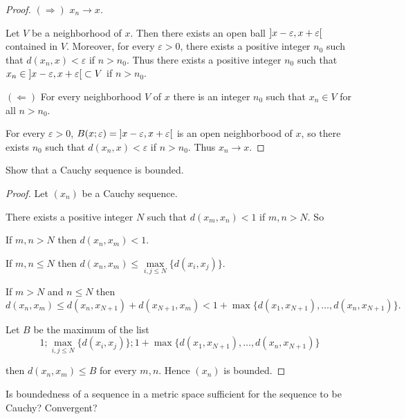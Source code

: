 \begin{proof}
    $(\Rightarrow)$ $x_{n}\to x$.

    Let $V$ be a neighborhood of $x$. Then there exists an open ball $\left]{x - \varepsilon, x + \varepsilon}\right[$ contained in $V$. Moreover, for every $\varepsilon > 0$, there exists a positive integer $n_{0}$ such that $d(x_{n}, x) < \varepsilon$ if $n > n_{0}$. Thus there exists a positive integer $n_{0}$ such that $x_{n}\in \left]{x - \varepsilon, x + \varepsilon}\right[\subset V$ if $n > n_{0}$.

    $(\Leftarrow)$ For every neighborhood $V$ of $x$ there is an integer $n_{0}$ such that $x_{n}\in V$ for all $n > n_{0}$.

    For every $\varepsilon > 0$, $B(x;\varepsilon) = \left]{x - \varepsilon, x + \varepsilon}\right[$ is an open neighborbood of $x$, so there exists $n_{0}$ such that $d(x_{n}, x) < \varepsilon$ if $n > n_{0}$. Thus $x_{n}\to x$.
\end{proof}

\begin{exercise}[Boundedness]\label{chapter1:section4:exercise4}
    Show that a Cauchy sequence is bounded.
\end{exercise}

\begin{proof}
    Let $(x_{n})$ be a Cauchy sequence.

    There exists a positive integer $N$ such that $d(x_{m}, x_{n}) < 1$ if $m, n > N$. So

    If $m, n > N$ then $d(x_{n}, x_{m}) < 1$.

    If $m, n\leq N$ then $d(x_{n}, x_{m}) \leq \max\limits_{i,j\leq N}\{ d(x_{i}, x_{j}) \}$.

    If $m > N$ and $n\leq N$ then
    \[
        d(x_{n}, x_{m})\leq d(x_{n}, x_{N+1}) + d(x_{N+1}, x_{m}) < 1 + \max\{ d(x_{1}, x_{N+1}), \ldots, d(x_{n}, x_{N+1}) \}.
    \]

    Let $B$ be the maximum of the list
    \[
        1; \max\limits_{ i, j\leq N }\{ d(x_{i}, x_{j})\}; 1 + \max\{ d(x_{1}, x_{N+1}), \ldots, d(x_{n}, x_{N+1}) \}
    \]

    then $d(x_{n}, x_{m}) \leq B$ for every $m, n$. Hence $(x_{n})$ is bounded.
\end{proof}

\begin{exercise}\label{chapter1:section4:exercise5}
    Is boundedness of a sequence in a metric space sufficient for the sequence to be Cauchy? Convergent?
\end{exercise}

